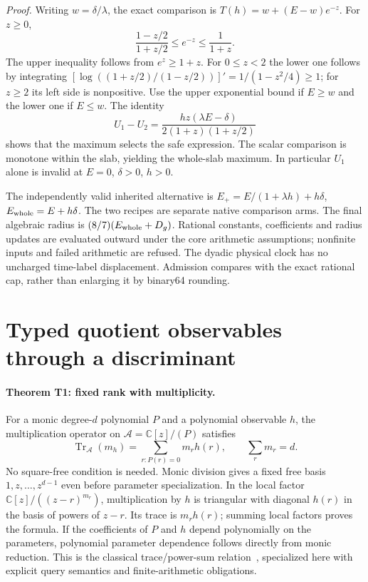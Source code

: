 \emph{Proof.}
Writing $w=\delta/\lambda$, the exact comparison is
$T(h)=w+(E-w)e^{-z}$. For $z\ge0$,
\begin{equation}
 \frac{1-z/2}{1+z/2}\le e^{-z}\le\frac1{1+z}.
\end{equation}
The upper inequality follows from $e^z\ge1+z$. For $0\le z<2$ the lower
one follows by integrating
$[\log((1+z/2)/(1-z/2))]'=1/(1-z^2/4)\ge1$; for $z\ge2$ its left side
is nonpositive. Use the upper exponential bound if $E\ge w$ and the lower
one if $E\le w$. The identity
\begin{equation}
 U_1-U_2=\frac{hz(\lambda E-\delta)}{2(1+z)(1+z/2)}
\end{equation}
shows that the maximum selects the safe expression. The scalar comparison
is monotone within the slab, yielding the whole-slab maximum.
In particular $U_1$ alone is invalid at $E=0$, $\delta>0$, $h>0$.

The independently valid inherited alternative is
$E_+=E/(1+\lambda h)+h\delta$, $E_{\rm whole}=E+h\delta$.
The two recipes are separate native comparison arms. The final algebraic
radius is $(8/7)(E_{\rm whole}+D_g)$. Rational constants, coefficients and
radius updates are evaluated outward under the core arithmetic assumptions;
nonfinite inputs and failed arithmetic are refused. The dyadic physical
clock has no uncharged time-label displacement. Admission compares with
the exact rational cap, rather than enlarging it by binary64 rounding.

\section{Typed quotient observables through a discriminant}
\label{sec:trace-theory}

\paragraph{Theorem T1: fixed rank with multiplicity.}
For a monic degree-$d$ polynomial $P$ and a polynomial observable $h$,
the multiplication operator on $\mathcal A=\mathbb C[z]/(P)$ satisfies
\begin{equation}
 \operatorname{Tr}_{\mathcal A}(m_h)
 =\sum_{r:P(r)=0}m_r h(r),\qquad \sum_r m_r=d.              \label{eq:trace-multiplicity}
\end{equation}
No square-free condition is needed. Monic division gives a fixed free basis
$1,z,\ldots,z^{d-1}$ even before parameter specialization. In the local
factor $\mathbb C[z]/((z-r)^{m_r})$, multiplication by $h$ is triangular
with diagonal $h(r)$ in the basis of powers of $z-r$. Its trace is
$m_rh(r)$; summing local factors proves the formula. If the coefficients of $P$ and $h$ depend polynomially on the parameters,
polynomial parameter dependence follows directly from monic reduction. This is the classical
trace/power-sum relation~\cite{BFSS2002}, specialized here with explicit
query semantics and finite-arithmetic obligations.

